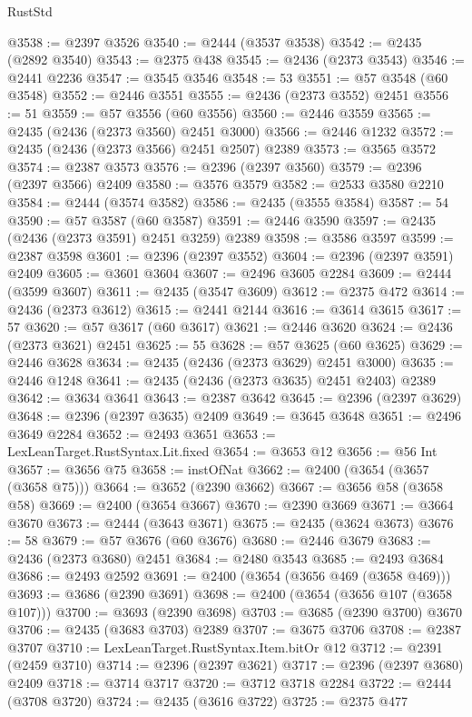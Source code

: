 \begin{lexlean}{RustStd}
\begin{coremodule}
@3538 := @2397 @3526
@3540 := @2444 (@3537 @3538)
@3542 := @2435 (@2892 @3540)
@3543 := @2375 @438
@3545 := @2436 (@2373 @3543)
@3546 := @2441 @2236
@3547 := @3545 @3546
@3548 := 53
@3551 := @57 @3548 (@60 @3548)
@3552 := @2446 @3551
@3555 := @2436 (@2373 @3552) @2451
@3556 := 51
@3559 := @57 @3556 (@60 @3556)
@3560 := @2446 @3559
@3565 := @2435 (@2436 (@2373 @3560) @2451 @3000)
@3566 := @2446 @1232
@3572 := @2435 (@2436 (@2373 @3566) @2451 @2507) @2389
@3573 := @3565 @3572
@3574 := @2387 @3573
@3576 := @2396 (@2397 @3560)
@3579 := @2396 (@2397 @3566) @2409
@3580 := @3576 @3579
@3582 := @2533 @3580 @2210
@3584 := @2444 (@3574 @3582)
@3586 := @2435 (@3555 @3584)
@3587 := 54
@3590 := @57 @3587 (@60 @3587)
@3591 := @2446 @3590
@3597 := @2435 (@2436 (@2373 @3591) @2451 @3259) @2389
@3598 := @3586 @3597
@3599 := @2387 @3598
@3601 := @2396 (@2397 @3552)
@3604 := @2396 (@2397 @3591) @2409
@3605 := @3601 @3604
@3607 := @2496 @3605 @2284
@3609 := @2444 (@3599 @3607)
@3611 := @2435 (@3547 @3609)
@3612 := @2375 @472
@3614 := @2436 (@2373 @3612)
@3615 := @2441 @2144
@3616 := @3614 @3615
@3617 := 57
@3620 := @57 @3617 (@60 @3617)
@3621 := @2446 @3620
@3624 := @2436 (@2373 @3621) @2451
@3625 := 55
@3628 := @57 @3625 (@60 @3625)
@3629 := @2446 @3628
@3634 := @2435 (@2436 (@2373 @3629) @2451 @3000)
@3635 := @2446 @1248
@3641 := @2435 (@2436 (@2373 @3635) @2451 @2403) @2389
@3642 := @3634 @3641
@3643 := @2387 @3642
@3645 := @2396 (@2397 @3629)
@3648 := @2396 (@2397 @3635) @2409
@3649 := @3645 @3648
@3651 := @2496 @3649 @2284
@3652 := @2493 @3651
@3653 := LexLeanTarget.RustSyntax.Lit.fixed
@3654 := @3653 @12
@3656 := @56 Int
@3657 := @3656 @75
@3658 := instOfNat
@3662 := @2400 (@3654 (@3657 (@3658 @75)))
@3664 := @3652 (@2390 @3662)
@3667 := @3656 @58 (@3658 @58)
@3669 := @2400 (@3654 @3667)
@3670 := @2390 @3669
@3671 := @3664 @3670
@3673 := @2444 (@3643 @3671)
@3675 := @2435 (@3624 @3673)
@3676 := 58
@3679 := @57 @3676 (@60 @3676)
@3680 := @2446 @3679
@3683 := @2436 (@2373 @3680) @2451
@3684 := @2480 @3543
@3685 := @2493 @3684
@3686 := @2493 @2592
@3691 := @2400 (@3654 (@3656 @469 (@3658 @469)))
@3693 := @3686 (@2390 @3691)
@3698 := @2400 (@3654 (@3656 @107 (@3658 @107)))
@3700 := @3693 (@2390 @3698)
@3703 := @3685 (@2390 @3700) @3670
@3706 := @2435 (@3683 @3703) @2389
@3707 := @3675 @3706
@3708 := @2387 @3707
@3710 := LexLeanTarget.RustSyntax.Item.bitOr @12
@3712 := @2391 (@2459 @3710)
@3714 := @2396 (@2397 @3621)
@3717 := @2396 (@2397 @3680) @2409
@3718 := @3714 @3717
@3720 := @3712 @3718 @2284
@3722 := @2444 (@3708 @3720)
@3724 := @2435 (@3616 @3722)
@3725 := @2375 @477

\end{coremodule}
\end{lexlean}
